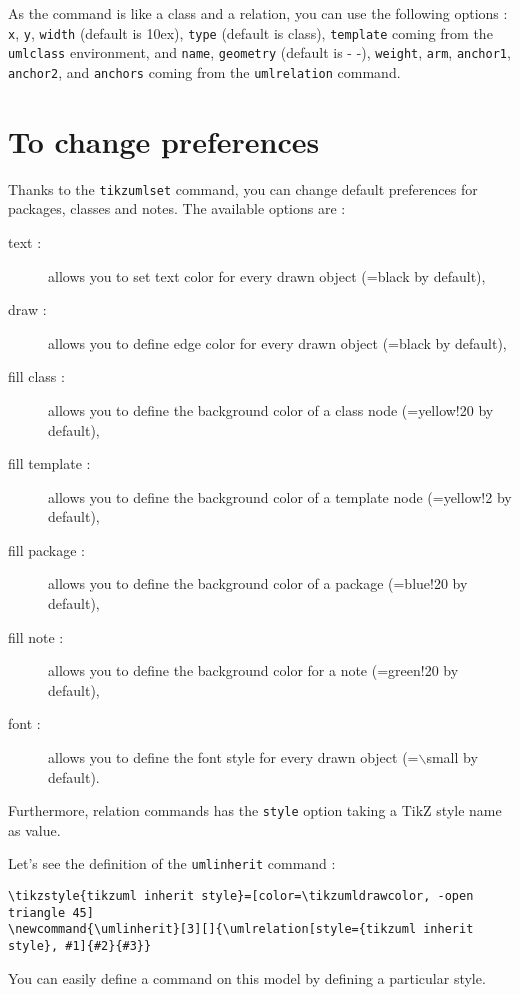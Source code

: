\documentclass[a4paper,11pt]{report}
\newcommand{\TikZ}{{\sc TikZ} \xspace}
\begin{document}
\medskip

As the command is like a class and a relation, you can use the following options : {\tt x}, {\tt y}, {\tt width} (default is 10ex), {\tt type} (default is class), {\tt template} coming from the {\tt umlclass} environment, and {\tt name}, {\tt geometry} (default is - -), {\tt weight}, {\tt arm}, {\tt anchor1}, {\tt anchor2}, and {\tt anchors} coming from the {\tt umlrelation} command.

\section{To change preferences}\label{s.classset}

Thanks to the {\tt tikzumlset} command, you can change default preferences for packages, classes and notes. The available options are :

\begin{description}
\item[text : ] allows you to set text color for every drawn object (=black by default),
\item[draw :] allows you to define edge color for every drawn object (=black by default),
\item[fill class :] allows you to define the background color of a class node (=yellow!20 by default),
\item[fill template :] allows you to define the background color of a template node (=yellow!2 by default),
\item[fill package :] allows you to define the background color of a package (=blue!20 by default),
\item[fill note :] allows you to define the background color for a note (=green!20 by default),
\item[font :] allows you to define the font style for every drawn object (=$\backslash$small by default).
\end{description}

Furthermore, relation commands has the {\tt style} option taking a \TikZ style name as value.

Let's see the definition of the {\tt umlinherit} command :

\begin{lstlisting}
\tikzstyle{tikzuml inherit style}=[color=\tikzumldrawcolor, -open triangle 45]
\newcommand{\umlinherit}[3][]{\umlrelation[style={tikzuml inherit style}, #1]{#2}{#3}}
\end{lstlisting}

You can easily define a command on this model by defining a particular style.
\end{document}

